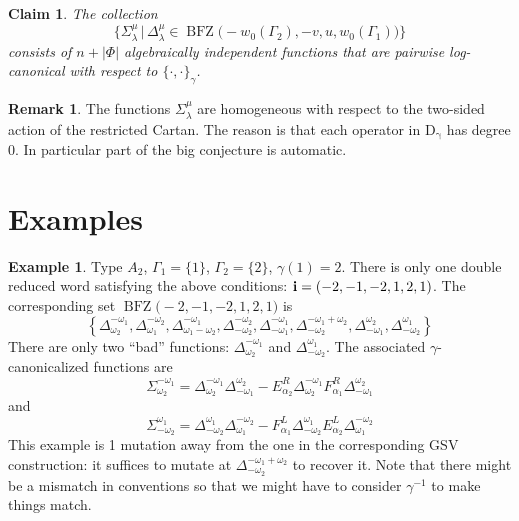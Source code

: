 \documentclass[a4paper]{amsart}
\newtheorem{claim}[theorem]{Claim}
\theoremstyle{definition}
\newtheorem{remark}[theorem]{Remark}
\newtheorem{example}[theorem]{Example}
\begin{document}
\begin{claim}
  The collection
  \[
    \Big\{
      \Sigma_\lambda^\mu\,\big|\, \Delta_\lambda^\mu\in \operatorname{BFZ}\big(-w_0(\Gamma_2),-v,u,w_0(\Gamma_1)\big)
    \Big\}
  \]
  consists of $n+|\Phi|$ algebraically independent functions that are pairwise log-canonical with respect to $\{\cdot,\cdot\}_\gamma$.
\end{claim}

\begin{remark}
  The functions $\Sigma_\lambda^\mu$ are homogeneous with respect to the two-sided action of the restricted Cartan.
  The reason is that each operator in $\operatorname{D_\gamma}$ has degree 0.
  In particular part of the big conjecture is automatic.
\end{remark}

\section{Examples}
\begin{example}
  Type $A_2$, $\Gamma_1=\{1\}$, $\Gamma_2=\{2\}$, $\gamma(1)=2$.
  There is only one double reduced word satisfying the above conditions: ${\bf i}=(-2, -1, -2, 1, 2, 1)$.
  The corresponding set $\operatorname{BFZ}\big(-2, -1, -2, 1, 2, 1\big)$ is 
  \[
    \left\{
    \Delta_{\omega_{2}}^{-\omega_{1}},
    \Delta_{\omega_{1}}^{-\omega_{2}},
    \Delta_{\omega_{1} - \omega_{2}}^{-\omega_{1}},
    \Delta_{-\omega_{2}}^{-\omega_{2}},
    \Delta_{-\omega_{1}}^{-\omega_{1}}, 
    \Delta_{-\omega_{2}}^{-\omega_{1} + \omega_{2}},
    \Delta_{-\omega_{1}}^{\omega_{2}},
    \Delta_{-\omega_{2}}^{\omega_{1}}
    \right\}
  \]
  There are only two ``bad'' functions: $\Delta_{\omega_{2}}^{-\omega_{1}}$ and $\Delta_{-\omega_{2}}^{\omega_{1}}$.
  The associated $\gamma$-canonicalized functions are
  \[
    \Sigma_{\omega_{2}}^{-\omega_{1}}=
    \Delta_{\omega_{2}}^{-\omega_{1}}\Delta_{-\omega_1}^{\omega_2} - E_{\alpha_2}^R\Delta_{\omega_{2}}^{-\omega_{1}} F_{\alpha_1}^R\Delta_{-\omega_1}^{\omega_2}
  \]
  and
  \[
    \Sigma_{-\omega_{2}}^{\omega_{1}}=
    \Delta_{-\omega_{2}}^{\omega_{1}}\Delta_{\omega_1}^{-\omega_2} - F_{\alpha_1}^L\Delta_{-\omega_{2}}^{\omega_{1}}E_{\alpha_2}^L\Delta_{\omega_1}^{-\omega_2}
  \]
  This example is 1 mutation away from the one in the corresponding GSV construction: it suffices to mutate at $\Delta_{-\omega_{2}}^{-\omega_{1} + \omega_{2}}$ to recover it.
  Note that there might be a mismatch in conventions so that we might have to consider $\gamma^{-1}$ to make things match.
\end{example}
\end{document}
